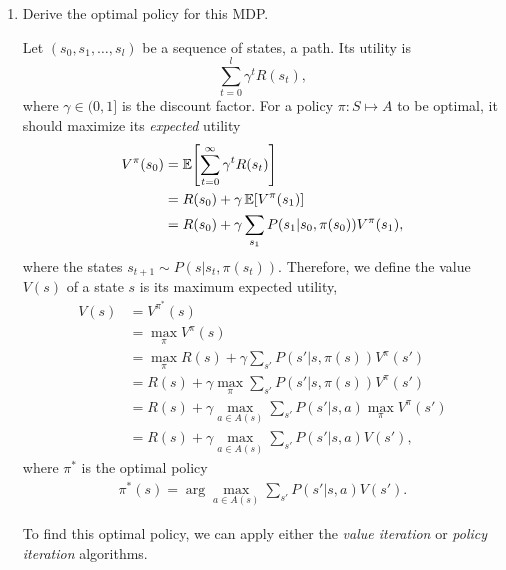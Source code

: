 \documentclass[11pt, a4paper]{article}
\begin{document}
\begin{enumerate}
    \item Derive the optimal policy for this MDP.

    \begin{solution}
        Let $(s_0, s_1, \dots, s_l)$ be a sequence of states, \ie{} a path. Its utility is
        \begin{equation*}
            \sum_{t = 0}^{l} \gamma^t R(s_t),
        \end{equation*}
        where $\gamma \in (0, 1]$ is the discount factor. For a policy $\pi : S \mapsto A$ to be optimal, it should maximize its \emph{expected} utility
        \begin{align*}
            V^\pi(s_0) & = \E \sbk*{\sum_{t = 0}^\infty \gamma^t R(s_t)} \\
            & = R(s_0) + \gamma \, \E \sbk*{V^\pi(s_1)} \\
            & = R(s_0) + \gamma \sum_{s_1} P(s_1 | s_0, \pi(s_0)) V^\pi(s_1),
        \end{align*}
        where the states $s_{t+1} \sim P(s | s_t, \pi(s_t))$. Therefore, we define the value $V(s)$ of a state $s$ is its maximum expected utility, \ie{}
        \begin{align*}
            V(s) & = V^{\pi^*}(s) \\
            & = \max_\pi V^\pi(s) \\
            & = \max_\pi R(s) + \gamma \sum_{s'} P(s' | s, \pi(s)) V^\pi(s') \\
            & = R(s) + \gamma \max_\pi \sum_{s'} P(s' | s, \pi(s)) V^\pi(s') \\
            & = R(s) + \gamma \max_{a \in A(s)} \sum_{s'} P(s' | s, a) \max_\pi V^\pi(s') \\
            & = R(s) + \gamma \max_{a \in A(s)} \sum_{s'} P(s' | s, a) V(s') ,
        \end{align*}
        where $\pi^*$ is the optimal policy
        \begin{align*}
            \pi^*(s) = \arg \max_{a \in A(s)} \sum_{s'} P(s' | s, a) V(s') .
        \end{align*}

        To find this optimal policy, we can apply either the \emph{value iteration} or \emph{policy iteration} algorithms.


\end{solution}
\end{enumerate}
\end{document}
